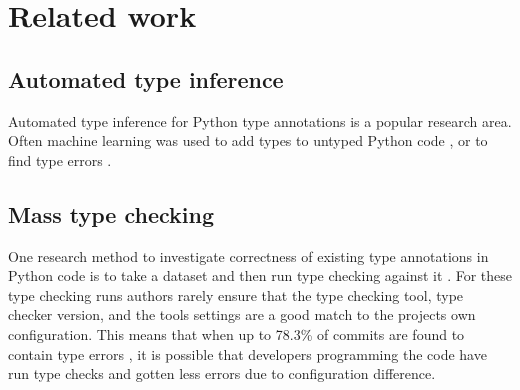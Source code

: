 \chapter{Related work\label{related_work}}

\section{Automated type inference}
Automated type inference for Python type annotations is a popular research area. Often machine learning was used to add types to untyped Python code \citetemp
, or to find type errors \citetemp. 

\section{Mass type checking}

One research method to investigate correctness of existing type annotations in Python code is to take a dataset and then run type checking against it \cite{rak-amnouykit_taleoftwo_2020, di_grazia_evolution_2022}. For these type checking runs authors rarely ensure that the type checking tool, type checker version, and the tools settings are a good match to the projects own configuration. This means that when up to 78.3\% of commits are found to contain type errors \cite{di_grazia_evolution_2022}, it is possible that developers programming the code have run type checks and gotten less errors due to configuration difference.


